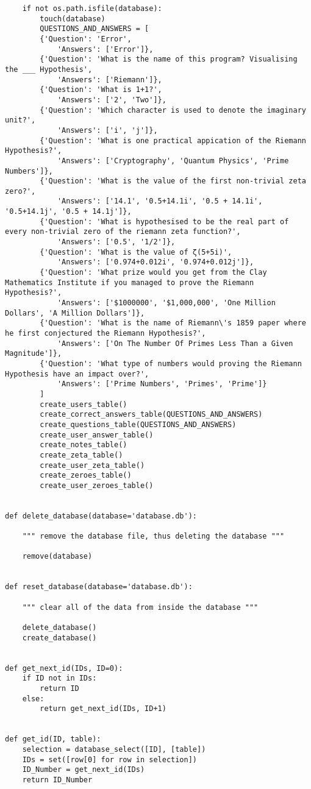 \documentclass{article}
\begin{document}
\begin{lstlisting}
    if not os.path.isfile(database):
        touch(database)
        QUESTIONS_AND_ANSWERS = [
        {'Question': 'Error',
            'Answers': ['Error']},
        {'Question': 'What is the name of this program? Visualising the ___ Hypothesis',
            'Answers': ['Riemann']},
        {'Question': 'What is 1+1?',
            'Answers': ['2', 'Two']},
        {'Question': 'Which character is used to denote the imaginary unit?',
            'Answers': ['i', 'j']},
        {'Question': 'What is one practical appication of the Riemann Hypothesis?',
            'Answers': ['Cryptography', 'Quantum Physics', 'Prime Numbers']},
        {'Question': 'What is the value of the first non-trivial zeta zero?',
            'Answers': ['14.1', '0.5+14.1i', '0.5 + 14.1i', '0.5+14.1j', '0.5 + 14.1j']},
        {'Question': 'What is hypothesised to be the real part of every non-trivial zero of the riemann zeta function?',
            'Answers': ['0.5', '1/2']},
        {'Question': 'What is the value of ζ(5+5i)',
            'Answers': ['0.974+0.012i', '0.974+0.012j']},
        {'Question': 'What prize would you get from the Clay Mathematics Institute if you managed to prove the Riemann Hypothesis?',
            'Answers': ['$1000000', '$1,000,000', 'One Million Dollars', 'A Million Dollars']},
        {'Question': 'What is the name of Riemann\'s 1859 paper where he first conjectured the Riemann Hypothesis?',
            'Answers': ['On The Number Of Primes Less Than a Given Magnitude']},
        {'Question': 'What type of numbers would proving the Riemann Hypothesis have an impact over?',
            'Answers': ['Prime Numbers', 'Primes', 'Prime']}
        ]
        create_users_table()
        create_correct_answers_table(QUESTIONS_AND_ANSWERS)
        create_questions_table(QUESTIONS_AND_ANSWERS)
        create_user_answer_table()
        create_notes_table()
        create_zeta_table()
        create_user_zeta_table()
        create_zeroes_table()
        create_user_zeroes_table()


def delete_database(database='database.db'):

    """ remove the database file, thus deleting the database """

    remove(database)


def reset_database(database='database.db'):

    """ clear all of the data from inside the database """

    delete_database()
    create_database()


def get_next_id(IDs, ID=0):
    if ID not in IDs:
        return ID
    else:
        return get_next_id(IDs, ID+1)


def get_id(ID, table):
    selection = database_select([ID], [table])
    IDs = set([row[0] for row in selection])
    ID_Number = get_next_id(IDs)
    return ID_Number
\end{lstlisting}
\end{document}
